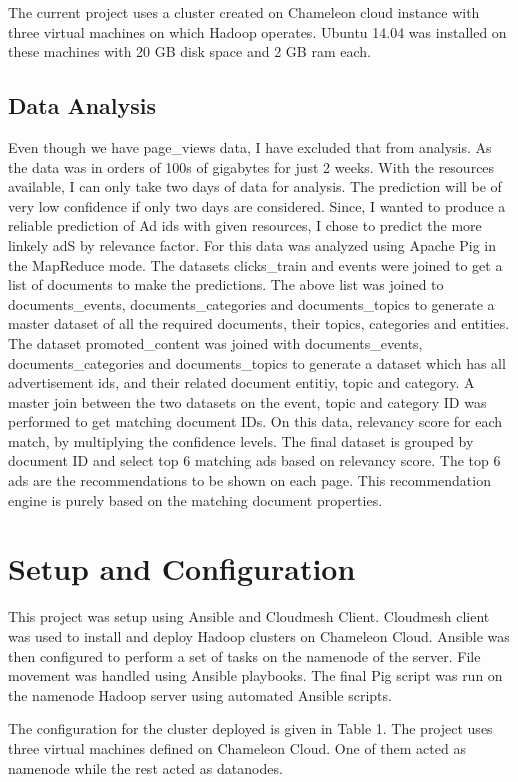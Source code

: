 \documentclass[9pt,twocolumn,twoside]{../../styles/osajnl}
\begin{document}
The current project uses a cluster created on Chameleon cloud instance with three virtual machines on which Hadoop operates. Ubuntu 14.04 was installed on these machines with 20 GB disk space and 2 GB ram each.

\subsection{Data Analysis}
Even though we have page\_views data, I have excluded that from analysis. As the data was in orders of 100s of gigabytes for just 2 weeks. With the resources available, I can only take two days of data for analysis. The prediction will be of very low confidence if only two days are considered. Since, I wanted to produce a reliable prediction of Ad ids with given resources, I chose to predict the more linkely adS by relevance factor. For this data was analyzed using Apache Pig in the MapReduce mode. The datasets clicks\_train and events were joined to get a list of documents to make the predictions. The above list was joined to documents\_events, documents\_categories and documents\_topics to generate a master dataset of all the required documents, their topics, categories and entities. The dataset promoted\_content was joined with documents\_events, documents\_categories and documents\_topics to generate a dataset which has all advertisement ids, and their related document entitiy, topic and category. A master join between the two datasets on the event, topic and category ID was performed to get matching document IDs. On this data, relevancy score for each match, by multiplying the confidence levels. The final dataset is grouped by document ID and select top 6 matching ads based on relevancy score. The top 6 ads are the recommendations to be shown on each page. This recommendation engine is purely based on the matching document properties.

\section{Setup and Configuration}
This project was setup using Ansible and Cloudmesh Client. Cloudmesh client was used to install and deploy Hadoop clusters on Chameleon Cloud. Ansible was then configured to perform a set of tasks on the namenode of the server. File movement was handled using Ansible playbooks. The final Pig script was run on the namenode Hadoop server using automated Ansible scripts.

The configuration for the cluster deployed is given in Table 1. The project uses three virtual machines defined on Chameleon Cloud. One of them acted as namenode while the rest acted as datanodes. 
\end{document}
